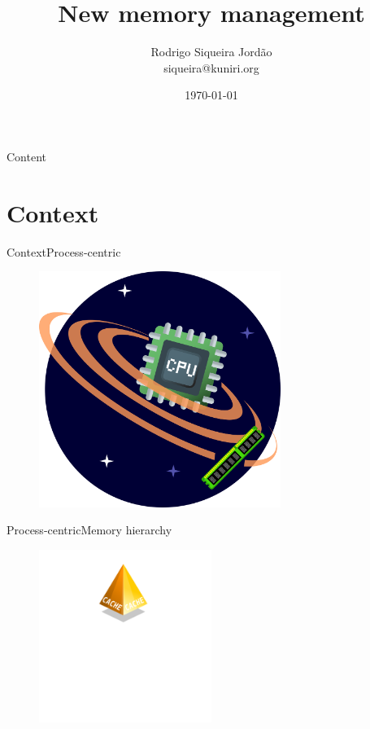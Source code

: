 \documentclass[10pt]{beamer}
\title[] %
{ %
      \textbf{New memory management}
}
\subtitle[SpaceJMP a new approach]
{
}
\author[Rodrigo Siqueira Jordão]
{      Rodrigo Siqueira Jordão\\
      {\ttfamily siqueira@kuniri.org}
}
\institute[]
{
      University of Sao Paulo\\
      Institute of Mathematics and Statistics\\
  
}
\date{\today}
\begin{document}

{\1%
\begin{frame} 
  \titlepage %
\end{frame}}

\begin{frame}{Content}{}
  \tableofcontents
\end{frame}

\section{Context}
\begin{frame}{Context}{Process-centric}
  \begin{figure}[ht]
    \centering
    \includegraphics[width=0.7\textwidth, keepaspectratio=true]{images/cpu_centric.png}
  \end{figure}
\end{frame}

\begin{frame}{Process-centric}{Memory hierarchy}
  \begin{figure}[ht]
    \centering
    \includegraphics[width=0.5\textwidth, keepaspectratio=true]{images/memory_hierarchy_cache.png}
  \end{figure}
\end{frame}
\end{document}
